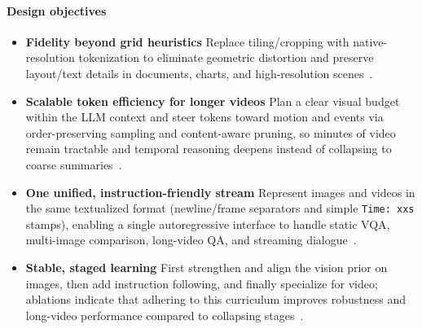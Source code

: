 \begin{enrichment}
\begin{enrichment}
        \paragraph{Design objectives}
        \begin{itemize}
            \item \textbf{Fidelity beyond grid heuristics} Replace tiling/cropping with native\mbox{-}resolution tokenization to eliminate geometric distortion and preserve layout/text details in documents, charts, and high\mbox{-}resolution scenes~\cite[Sec.~3.1]{zhang2025_videollama3}.
            \item \textbf{Scalable token efficiency for longer videos} Plan a clear visual budget within the LLM context and steer tokens toward motion and events via order\mbox{-}preserving sampling and content\mbox{-}aware pruning, so minutes of video remain tractable and temporal reasoning deepens instead of collapsing to coarse summaries~\cite[Sec.~2--3]{zhang2025_videollama3}.
            \item \textbf{One unified, instruction\mbox{-}friendly stream} Represent images and videos in the same textualized format (newline/frame separators and simple \texttt{Time: xxs} stamps), enabling a single autoregressive interface to handle static VQA, multi\mbox{-}image comparison, long\mbox{-}video QA, and streaming dialogue~\cite[Sec.~3.3]{zhang2025_videollama3}.
            \item \textbf{Stable, staged learning} First strengthen and align the vision prior on images, then add instruction following, and finally specialize for video; ablations indicate that adhering to this curriculum improves robustness and long\mbox{-}video performance compared to collapsing stages~\cite[Sec.~4.5]{zhang2025_videollama3}.
        \end{itemize}
        

\end{enrichment}
\end{enrichment}
